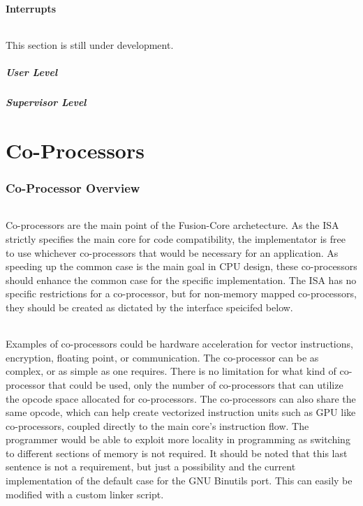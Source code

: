 \documentclass[letterpaper, 11pt]{article}
\begin{document}
\subsection{Interrupts}
\paragraph{} This section is still under development.
\subsubsection{User Level}
\subsubsection{Supervisor Level}

\clearpage
\part{Co-Processors}
\section{Co-Processor Overview}
\paragraph{}Co-processors are the main point of the Fusion-Core archetecture. As the ISA strictly specifies the main core for code compatibility,
the implementator is free to use whichever co-processors that would be necessary for an application. As speeding up the common case is the main goal in CPU design,
these co-processors should enhance the common case for the specific implementation. The ISA has no specific restrictions for a co-processor, but for non-memory
mapped co-processors, they should be created as dictated by the interface speicifed below.

\paragraph{} Examples of co-processors could be hardware acceleration for vector instructions, encryption, floating point, or communication.
The co-processor can be as complex, or as simple as one requires. There is no limitation for what kind of co-processor that could be used, 
only the number of co-processors that can utilize the opcode space allocated for co-processors. The co-processors can also share the same opcode, which
can help create vectorized instruction units such as GPU like co-processors, coupled directly to the main core's instruction flow. The programmer would
be able to exploit more locality in programming as switching to different sections of memory is not required. It should be noted that this last sentence is
not a requirement, but just a possibility and the current implementation of the default case for the GNU Binutils port. This can easily be modified with a 
custom linker script.
\end{document}
